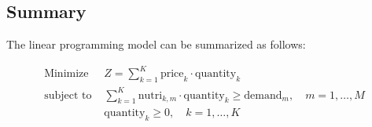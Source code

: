 \documentclass{article}
\begin{document}
\subsection*{Summary}
The linear programming model can be summarized as follows:

\begin{align*}
\text{Minimize } & Z = \sum_{k=1}^{K} \text{price}_k \cdot \text{quantity}_k \\
\text{subject to } & \sum_{k=1}^{K} \text{nutri}_{k,m} \cdot \text{quantity}_k \geq \text{demand}_m, \quad m = 1, \ldots, M \\
                   & \text{quantity}_k \geq 0, \quad k = 1, \ldots, K
\end{align*}
\end{document}
